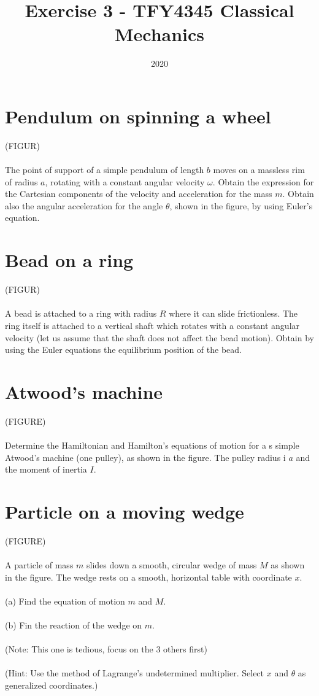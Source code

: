 \documentclass{article}
\title{Exercise 3 - TFY4345 Classical Mechanics}
\date{2020}
\begin{document}
    \maketitle
    \section{Pendulum on spinning a wheel}
    (FIGUR) \\ \\
    The point of support of a simple pendulum of length $b$ moves on a massless rim of radius $a$, rotating with a constant angular velocity $\omega$. Obtain the expression for the Cartesian components of the velocity and acceleration for the mass $m$. Obtain also the angular acceleration for the angle $\theta$, shown in the figure, by using Euler's equation.

    \section{Bead on a ring}
    (FIGUR) \\ \\
    A bead is attached to a ring with radius $R$ where it can slide frictionless. The ring itself is attached to a vertical shaft which rotates with a constant angular velocity (let us assume that the shaft does not affect the bead motion). Obtain by using the Euler equations the equilibrium position of the bead.

    \section{Atwood's machine}
    (FIGURE) \\ \\
    Determine the Hamiltonian and Hamilton's equations of motion for a s simple Atwood's machine (one pulley), as shown in the figure. The pulley radius i $a$ and the moment of inertia $I$.

    \section{Particle on a moving wedge}
    (FIGURE) \\ \\
    A particle of mass $m$ slides down a smooth, circular wedge of mass $M$ as shown in the figure. The wedge rests on a smooth, horizontal table with coordinate $x$. \\ \\
    (a) Find the equation of motion $m$ and $M$. \\ \\
    (b) Fin the reaction of the wedge on $m$. \\ \\
    (Note: This one is tedious, focus on the 3 others first) \\ \\
    (Hint: Use the method of Lagrange's undetermined multiplier. Select $x$ and $\theta$ as generalized coordinates.)
\end{document}
